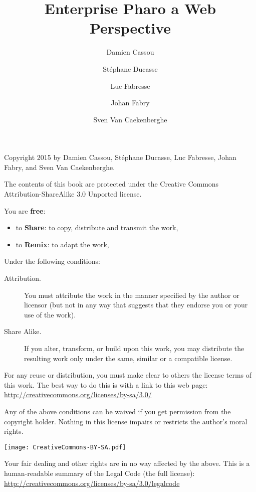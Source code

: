 \documentclass[10pt,twoside,english]{support/latex/sbabook/sbabook}
\title{Enterprise Pharo\titlebreak{:} a Web Perspective}
\author{
    Damien Cassou \and
    Stéphane Ducasse \and
    Luc Fabresse \and
    Johan Fabry \and
    Sven Van Caekenberghe}
\date{\gitdate\titlebreak[\smallskip]{ -- }\protect\gitCommitInfo}
\begin{document}
\maketitle
\pagestyle{titlingpage}
\thispagestyle{titlingpage} %

\cleartoverso
{\small

  Copyright 2015 by Damien Cassou, Stéphane Ducasse, Luc Fabresse, Johan Fabry,
  and Sven Van Caekenberghe.

  The contents of this book are protected under the Creative Commons
  Attribution-ShareAlike 3.0 Unported license.

  You are \textbf{free}:
  \begin{itemize}
  \item to \textbf{Share}: to copy, distribute and transmit the work,
  \item to \textbf{Remix}: to adapt the work,
  \end{itemize}

  Under the following conditions:
  \begin{description}
  \item[Attribution.] You must attribute the work in the manner specified by the
    author or licensor (but not in any way that suggests that they endorse you
    or your use of the work).
  \item[Share Alike.] If you alter, transform, or build upon this work, you may
    distribute the resulting work only under the same, similar or a compatible
    license.
  \end{description}

  For any reuse or distribution, you must make clear to others the
  license terms of this work. The best way to do this is with a link to
  this web page: \\
  \url{http://creativecommons.org/licenses/by-sa/3.0/}

  Any of the above conditions can be waived if you get permission from
  the copyright holder. Nothing in this license impairs or restricts the
  author's moral rights.

  \begin{center}
    \texttt{[image: CreativeCommons-BY-SA.pdf]}
  \end{center}

  Your fair dealing and other rights are in no way affected by the
  above. This is a human-readable summary of the Legal Code (the full
  license): \\
  \url{http://creativecommons.org/licenses/by-sa/3.0/legalcode}

}
\end{document}
